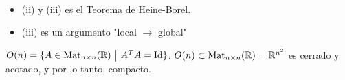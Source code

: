 \begin{remark}~
	\begin{itemize}
		\item (ii) y (iii) es el Teorema de Heine-Borel.

		\item (iii) es un argumento "local $\rightarrow$ global"
	\end{itemize}
\end{remark}

\begin{eg}
	$O(n) = \{A \in \Mat_{n \times n}(\R) \ \big| \ A^{T}A = \Id \}$. $O(n) \subset \operatorname{Mat}_{n \times n}(\mathbb{R}) = \mathbb{R}^{n^2}$ es cerrado y acotado, y por lo tanto, compacto.
\end{eg}
